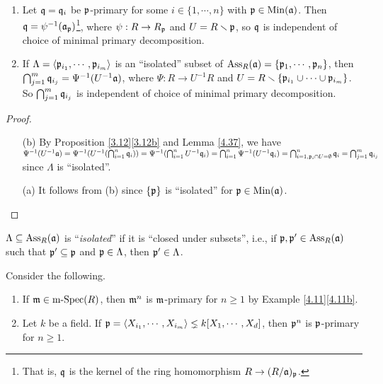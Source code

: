 \begin{theorem}\label{4.38}
    \begin{enumerate}
        \item Let $\mathfrak{q} = \mathfrak{q}_i$ be $\mathfrak{p}$-primary for some $i \in \{1,\cdots,n\}$ 
            with $\mathfrak{p} \in \operatorname{Min}(\mathfrak{a})$. Then $\mathfrak{q} = \psi^{-1}(\mathfrak{a}_{\mathfrak{p}})$\footnote[2]{That is, $\mathfrak{q}$ is the kernel of the ring homomorphism $R \to (R/\mathfrak{a})_{\mathfrak{p}}$.}, where $\psi: R \to R_{\mathfrak{p}}$ and $U = R \smallsetminus \mathfrak{p}$, so $\mathfrak{q}$ is independent of choice of minimal primary decomposition.
        \item If $\Lambda = \langle \mathfrak{p}_{i_1},\cdots,\mathfrak{p}_{i_m} \rangle$ is an ``isolated'' subset of $\operatorname{Ass}_R(\mathfrak{a}) = \{\mathfrak{p}_1,\cdots,\mathfrak{p}_n\}$, then $\bigcap_{j=1}^{m} \mathfrak{q}_{i_j} = \Psi^{-1}(U^{-1}\mathfrak{a})$, where $\Psi: R \to U^{-1}R$ and $U = R \smallsetminus \{\mathfrak{p}_{i_1} \cup \cdots \cup \mathfrak{p}_{i_m}\}$. So $\bigcap_{j=1}^{m}\mathfrak{q}_{i_j}$ is independent of choice of minimal primary decomposition.
    \end{enumerate}
\end{theorem}

\begin{proof}
    \begin{enumerate}
        \item [(b)] By Proposition \ref{3.12}\ref{3.12b} and Lemma \ref{4.37}, we have $\Psi^{-1}(U^{-1}\mathfrak{a}) = \Psi^{-1}(U^{-1}(\bigcap_{i=1}^{n}\mathfrak{q}_i)) = \Psi^{-1}(\bigcap_{i=1}^{n}U^{-1}\mathfrak{q}_i) = \bigcap_{i=1}^{n} \Psi^{-1}(U^{-1}\mathfrak{q}_i) = \bigcap_{i=1,\mathfrak{p}_i \cap U = \emptyset}^{n} \mathfrak{q}_i = \bigcap_{j=1}^{m} \mathfrak{q}_{i_j}$ since $\Lambda$ is ``isolated''.
        \item [(a)] It follows from (b) since $\{\mathfrak{p}\}$ is ``isolated'' for $\mathfrak{p} \in \operatorname{Min}(\mathfrak{a})$. \qedhere
    \end{enumerate}
\end{proof}

\begin{definition}\label{4.39}
    $\Lambda \subseteq \operatorname{Ass}_R(\mathfrak{a})$ is ``\emph{isolated}'' if it is ``closed under subsets'', i.e., if $\mathfrak{p}, \mathfrak{p}' \in \operatorname{Ass}_R(\mathfrak{a})$ such that $\mathfrak{p}' \subseteq \mathfrak{p}$ and $\mathfrak{p} \in \Lambda$, then $\mathfrak{p}' \in \Lambda$.
\end{definition}

\begin{discussion}\label{4.40}
    Consider the following.
    \begin{enumerate}
        \item\label{4.40a}
            If $\mathfrak{m} \in \operatorname{m-Spec}(R)$, then $\mathfrak{m}^{n}$ is $\mathfrak{m}$-primary for $n \geq 1$ by Example \ref{4.11}\ref{4.11b}. \par 
        \item\label{4.40b} 
            Let $k$ be a field. If $\mathfrak{p} = \langle X_{i_1}, \cdots, X_{i_m} \rangle \lneq k[X_1,\cdots,X_d]$, then $\mathfrak{p}^{n}$ is $\mathfrak{p}$-primary for $n \geq 1$.
    \end{enumerate}
\end{discussion}

